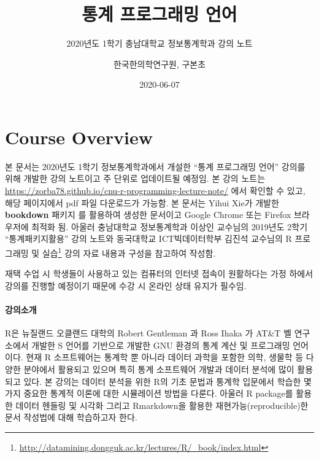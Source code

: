 \documentclass[
  11pt,
]{krantz}
\title{통계 프로그래밍 언어}
\subtitle{2020년도 1학기 충남대학교 정보통계학과 강의 노트}
\author{한국한의학연구원, 구본초}
\date{2020-06-07}
\makeatletter
\renewcommand{\href}[2]{#2\footnote{\url{#1}}}
\newenvironment{kframe}{%
\medskip{}
\setlength{\fboxsep}{.8em}
 \def\at@end@of@kframe{}%
 \ifinner\ifhmode%
  \def\at@end@of@kframe{\end{minipage}}%
  \begin{minipage}{\columnwidth}%
 \fi\fi%
 \def\FrameCommand##1{\hskip\@totalleftmargin \hskip-\fboxsep
 \colorbox{shadecolor}{##1}\hskip-\fboxsep
     \hskip-\linewidth \hskip-\@totalleftmargin \hskip\columnwidth}%
 \MakeFramed {\advance\hsize-\width
   \@totalleftmargin\z@ \linewidth\hsize
   \@setminipage}}%
 {\par\unskip\endMakeFramed%
 \at@end@of@kframe}
\newenvironment{rmdblock}[1]
  {
  \begin{itemize}
  \renewcommand{\labelitemi}{
    \raisebox{-.7\height}[0pt][0pt]{
      {\setkeys{Gin}{width=3em,keepaspectratio}\texttt{[image: images/\#1]}}
    }
  }
  \setlength{\fboxsep}{1em}
  \begin{kframe}
  \item
  }
  {
  \end{kframe}
  \end{itemize}
  }
\newenvironment{rmdnote}
  {\begin{rmdblock}{note}}
  {\end{rmdblock}}
\makeatother
\begin{document}
\maketitle

{
\hypersetup{linkcolor=}
\setcounter{tocdepth}{2}
\tableofcontents
}
\listoftables
\listoffigures
\hypertarget{overview}{%
\chapter*{Course Overview}\label{overview}}


\begin{rmdnote}
\begin{rmdnote}

본 문서는 2020년도 1학기 정보통계학과에서 개설한 ``통계 프로그래밍 언어'' 강의를 위해 개발한 강의 노트이고 주 단위로 업데이트될 예정임. 본 강의 노트는 \url{https://zorba78.github.io/cnu-r-programming-lecture-note/} 에서 확인할 수 있고, 해당 페이지에서 pdf 파일 다운로드가 가능함. 본 문서는 Yihui Xie가 개발한 \textbf{bookdown} 패키지 \citep{xie-2016}를 활용하여 생성한 문서이고 Google Chrome 또는 Firefox 브라우저에 최적화 됨. 아울러 충남대학교 정보통계학과 이상인 교수님의 2019년도 2학기 ``통계패키지활용'' 강의 노트와 동국대학교 ICT빅데이터학부 김진석 교수님의 \href{http://datamining.dongguk.ac.kr/lectures/R/_book/index.html}{R 프로그래밍 및 실습} 강의 자료 내용과 구성을 참고하여 작성함.

재택 수업 시 학생들이 사용하고 있는 컴퓨터의 인터넷 접속이 원활하다는 가정 하에서 강의를 진행할 예정이기 때문에 수강 시 온라인 상태 유지가 필수임.

\end{rmdnote}
\end{rmdnote}

\hypertarget{intro-lec}{%
\subsubsection*{강의소개}\label{intro-lec}}


R은 뉴질랜드 오클랜드 대학의 Robert Gentleman 과 Ross Ihaka 가 AT\&T 벨 연구소에서 개발한 S 언어를 기반으로 개발한 GNU 환경의 통계 계산 및 프로그래밍 언어이다. 현재 R 소프트웨어는 통계학 뿐 아니라 데이터 과학을 포함한 의학, 생물학 등 다양한 분야에서 활용되고 있으며 특히 통계 소프트웨어 개발과 데이터 분석에 많이 활용되고 있다. 본 강의는 데이터 분석을 위한 R의 기초 문법과 통계학 입문에서 학습한 몇 가지 중요한 통계적 이론에 대한 시뮬레이션 방법을 다룬다. 아울러 R package를 활용한 데이터 헨들링 및 시각화 그리고 Rmarkdown을 활용한 재현가능(reproducible)한 문서 작성법에 대해 학습하고자 한다.
\end{document}
